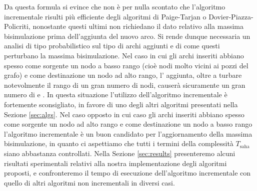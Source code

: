 Da questa formula si evince che non è per nulla scontato che l'algoritmo incrementale risulti più efficiente degli algoritmi di Paige-Tarjan o Dovier-Piazza-Policriti, nonostante questi ultimi non richiedano il dato relativo alla massima bisimulazione prima dell'aggiunta del nuovo arco. Si rende dunque necessaria un analisi di tipo probabilistico sul tipo di archi aggiunti e di come questi perturbano la massima bisimulazione. Nel caso in cui gli archi inseriti abbiano spesso come sorgente un nodo a basso rango (cioè nodi molto vicini ai pozzi del grafo) e come destinazione un nodo ad alto rango, l' aggiunta, oltre a turbare notevolmente il rango di un gran numero di nodi, causerà sicuramente un gran numero di  e . In questa situazione l'utilizzo dell'algoritmo incrementale è fortemente sconsigliato, in favore di uno degli altri algoritmi presentati nella Sezione \ref{sec:algs}. Nel caso opposto in cui caso gli archi inseriti abbiano spesso come sorgente un nodo ad alto rango e come destinazione un nodo a basso rango l'algoritmo incrementale è un buon candidato per l'aggiornamento della massima bisimulazione, in quanto ci aspettiamo che tutti i termini della complessità $T_{\text{saha}}$ siano abbastanza controllati. Nella Sezione \ref{sec:results} presenteremo alcuni risultati sperimentali relativi alla nostra implementazione degli algoritmi proposti, e confronteremo il tempo di esecuzione dell'algoritmo incrementale con quello di altri algoritmi non incrementali in diversi casi.
